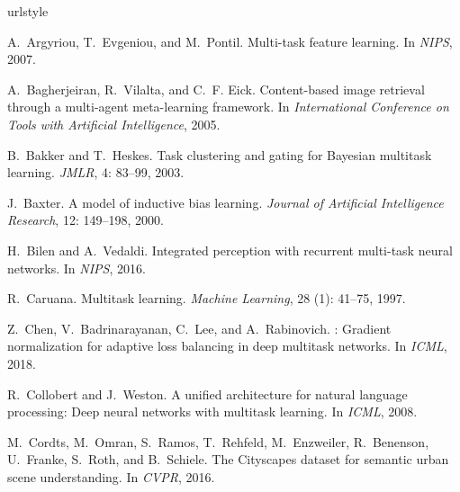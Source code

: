 \documentclass{article}
\begin{document}
{\small


\begin{thebibliography}{60}
\providecommand{\natexlab}[1]{#1}
\providecommand{\url}[1]{\texttt{#1}}
\expandafter\ifx\csname urlstyle\endcsname\relax
  \providecommand{\doi}[1]{doi: #1}\else
  \providecommand{\doi}{doi: \begingroup \urlstyle{rm}\Url}\fi

A.~Argyriou, T.~Evgeniou, and M.~Pontil.
\newblock Multi-task feature learning.
\newblock In \emph{NIPS}, 2007.

A.~Bagherjeiran, R.~Vilalta, and C.~F. Eick.
\newblock Content-based image retrieval through a multi-agent meta-learning
  framework.
\newblock In \emph{International Conference on Tools with Artificial
  Intelligence}, 2005.

B.~Bakker and T.~Heskes.
\newblock Task clustering and gating for {Bayesian} multitask learning.
\newblock \emph{JMLR}, 4: 83--99, 2003.

J.~Baxter.
\newblock A model of inductive bias learning.
\newblock \emph{Journal of Artificial Intelligence Research}, 12:
  149--198, 2000.

H.~Bilen and A.~Vedaldi.
\newblock Integrated perception with recurrent multi-task neural networks.
\newblock In \emph{NIPS}, 2016.

R.~Caruana.
\newblock Multitask learning.
\newblock \emph{Machine Learning}, 28 (1): 41--75, 1997.

Z.~Chen, V.~Badrinarayanan, C.~Lee, and A.~Rabinovich.
: Gradient normalization for adaptive loss balancing in
  deep multitask networks.
\newblock In \emph{{ICML}}, 2018.

R.~Collobert and J.~Weston.
\newblock A unified architecture for natural language processing: Deep neural
  networks with multitask learning.
\newblock In \emph{ICML}, 2008.

M.~Cordts, M.~Omran, S.~Ramos, T.~Rehfeld, M.~Enzweiler, R.~Benenson,
  U.~Franke, S.~Roth, and B.~Schiele.
\newblock The {Cityscapes} dataset for semantic urban scene understanding.
\newblock In \emph{{CVPR}}, 2016.


\end{thebibliography}}
\end{document}
